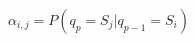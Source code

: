 \documentclass[12pt]{article}
\begin{document}
\begin{equation}
    \nonumber \alpha_{i,j} = P(q_p = S_j | q_{p-1} = S_i)
\end{equation}
\end{document}
